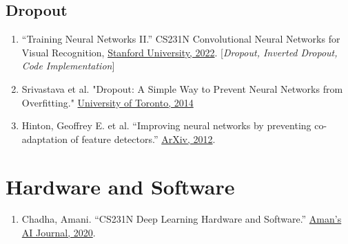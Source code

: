 \documentclass[12pt]{article}
\begin{document}
\subsection{Dropout}
\begin{enumerate}
    \item “Training Neural Networks II.” 
    CS231N Convolutional Neural Networks for Visual Recognition, 
    \href{https://cs231n.github.io/neural-networks-2/#reg}{Stanford University, 2022}. 
    [\emph{Dropout, Inverted Dropout, Code Implementation}]

    \item Srivastava et al. "Dropout: A Simple Way to Prevent Neural Networks 
    from Overfitting." 
    \href{http://www.cs.toronto.edu/~rsalakhu/papers/srivastava14a.pdf}
    {University of Toronto, 2014}

    \item Hinton, Geoffrey E. et al. “Improving neural networks 
    by preventing co-adaptation of feature detectors.” 
    \href{https://arxiv.org/abs/1207.0580}{ArXiv, 2012}.
\end{enumerate}

\section{Hardware and Software}
\begin{enumerate}
    \item Chadha, Amani. “CS231N Deep Learning Hardware and Software.” 
    \href{https://aman.ai/cs231n/deeplearning-HW-SW/}
    {Aman's AI Journal, 2020}.
\end{enumerate}
\end{document}
